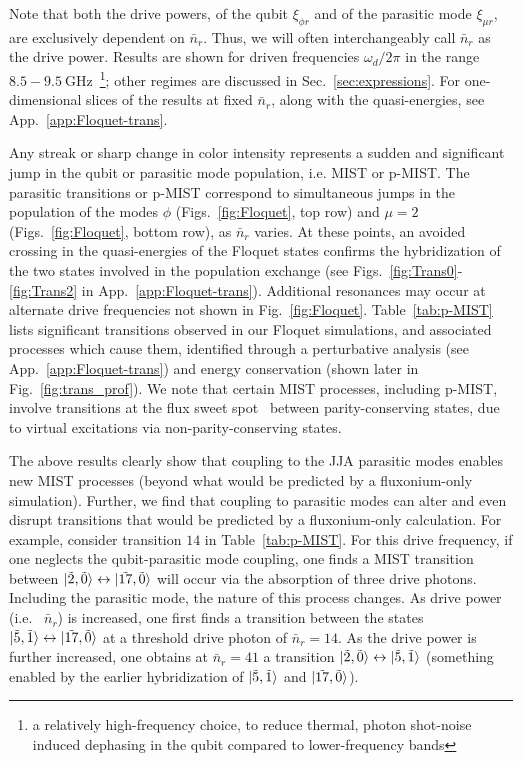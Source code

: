 \documentclass[%
reprint,
superscriptaddress,
 amsmath,amssymb,
 aps,
 prx,
longbibliography,
floatfix,
]{revtex4-2}
\begin{document}
Note that both the drive powers, of the qubit $\xi_{\phi r}$ and of the parasitic mode $\xi_{\mu r}$, are exclusively dependent on $\bar n_r$. Thus, we will often interchangeably call $\bar n_r$ as the drive power. Results are shown for driven frequencies $\omega_d / 2 \pi$ in the range  
$8.5 - 9.5 \ \mathrm{GHz}$~\footnote{a relatively high-frequency choice, to reduce thermal, photon shot-noise induced dephasing in the qubit compared to lower-frequency bands}; other regimes are discussed in Sec.~\ref{sec:expressions}. For one-dimensional slices of the results at fixed $\bar n_r$, along with the quasi-energies, see App.~\ref{app:Floquet-trans}. 

Any streak or sharp change in color intensity represents a sudden and significant jump in the qubit or parasitic mode population, i.e. MIST or p-MIST. The parasitic transitions or p-MIST correspond to simultaneous jumps in the population of the modes $\phi$ (Figs.~\ref{fig:Floquet}, top row) and $\mu=2$ (Figs.~\ref{fig:Floquet}, bottom row), as $\bar{n}_r$ varies. At these points, an avoided crossing in the quasi-energies of the Floquet states confirms the hybridization of the two states involved in the population exchange (see Figs.~\ref{fig:Trans0}-\ref{fig:Trans2} in App.~\ref{app:Floquet-trans}). Additional resonances may occur at alternate drive frequencies not shown in Fig.~\ref{fig:Floquet}. Table~\ref{tab:p-MIST} lists significant transitions observed in our Floquet simulations, and associated processes which cause them, identified through a perturbative analysis (see App.~\ref{app:Floquet-trans}) and energy conservation (shown later in Fig.~\ref{fig:trans_prof}). We note that certain MIST processes, including p-MIST, involve transitions at the flux sweet spot~\cite{zhu_circuit_2013} between parity-conserving states, due to virtual excitations via non-parity-conserving states. 

The above results clearly show that coupling to the JJA parasitic modes enables new MIST processes (beyond what would be predicted by a fluxonium-only simulation).  Further, we find that coupling to parasitic modes can alter and even disrupt transitions that would be predicted by a fluxonium-only calculation.  For example, consider transition $14$ in Table~\ref{tab:p-MIST}.  For this drive frequency, if one neglects the qubit-parasitic mode coupling, one finds a MIST transition between   
$ \ket{\tilde{2},\tilde{0}} \leftrightarrow \ket{\tilde{17},\tilde{0}}$ will occur via the absorption of three drive photons.  
Including the parasitic mode, the nature of this process changes.  As drive power (i.e. ~$\bar{n}_r$) is increased, one first finds a transition between the states $\ket{\tilde{5},\tilde{1}}\leftrightarrow \ket{\tilde{17},\tilde{0}}$ at a threshold drive photon of $\bar n_r=14$. As the drive power is further increased, one obtains at $\bar n_r=41$ a transition $\ket{\tilde{2},\tilde{0}}\leftrightarrow \ket{\tilde{5},\tilde{1}}$ (something enabled by the earlier hybridization of $\ket{\tilde{5},\tilde{1}}$ 
and  $\ket{\tilde{17},\tilde{0}}$).
\end{document}
